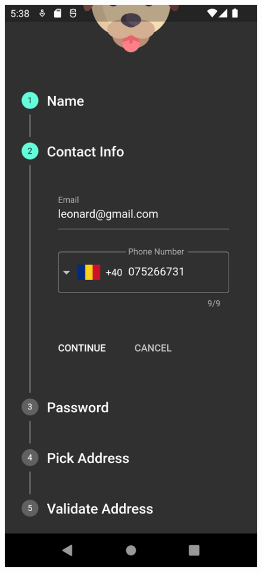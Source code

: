 \begin{figure}[!htb]
      \includegraphics[width=\linewidth]{images/screenshots/register.png}

\end{figure}
